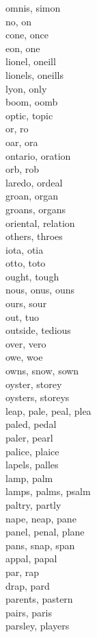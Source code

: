omnis, simon\\
no, on\\
cone, once\\
eon, one\\
lionel, oneill\\
lionels, oneills\\
lyon, only\\
boom, oomb\\
optic, topic\\
or, ro\\
oar, ora\\
ontario, oration\\
orb, rob\\
laredo, ordeal\\
groan, organ\\
groans, organs\\
oriental, relation\\
others, throes\\
iota, otia\\
otto, toto\\
ought, tough\\
nous, onus, ouns\\
ours, sour\\
out, tuo\\
outside, tedious\\
over, vero\\
owe, woe\\
owns, snow, sown\\
oyster, storey\\
oysters, storeys\\
leap, pale, peal, plea\\
paled, pedal\\
paler, pearl\\
palice, plaice\\
lapels, palles\\
lamp, palm\\
lamps, palms, psalm\\
paltry, partly\\
nape, neap, pane\\
panel, penal, plane\\
pans, snap, span\\
appal, papal\\
par, rap\\
drap, pard\\
parents, pastern\\
pairs, paris\\
parsley, players\\
